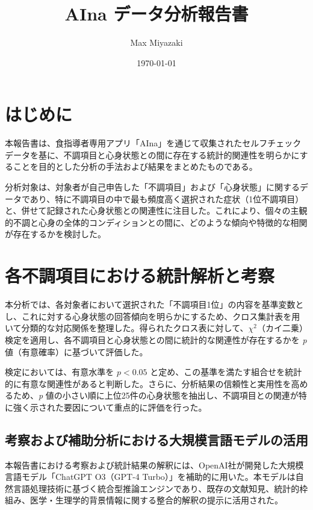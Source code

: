 \documentclass[a4paper,12pt]{article}
\title{AIna データ分析報告書}
\author[1,2]{Max Miyazaki}
\affil[1]{株式会社FiveVai}
\affil[2]{東京都立大学理学研究科物理学専攻}
\date{\today}
\begin{document}
\maketitle

\newpage
\tableofcontents
\newpage


\section*{はじめに}

本報告書は、食指導者専用アプリ「AIna」を通じて収集されたセルフチェックデータを基に、不調項目と心身状態との間に存在する統計的関連性を明らかにすることを目的とした分析の手法および結果をまとめたものである。

分析対象は、対象者が自己申告した「不調項目」および「心身状態」に関するデータであり、特に不調項目の中で最も頻度高く選択された症状（1位不調項目）と、併せて記録された心身状態との関連性に注目した。これにより、個々の主観的不調と心身の全体的コンディションとの間に、どのような傾向や特徴的な相関が存在するかを検討した。

\section*{各不調項目における統計解析と考察}

本分析では、各対象者において選択された「不調項目1位」の内容を基準変数とし、これに対する心身状態の回答傾向を明らかにするため、クロス集計表を用いて分類的な対応関係を整理した。得られたクロス表に対して、$\chi^2$（カイ二乗）検定を適用し、各不調項目と心身状態との間に統計的な関連性が存在するかを \textit{p} 値（有意確率）に基づいて評価した。

検定においては、有意水準を $p < 0.05$ と定め、この基準を満たす組合せを統計的に有意な関連性があると判断した。さらに、分析結果の信頼性と実用性を高めるため、\textit{p} 値の小さい順に上位25件の心身状態を抽出し、不調項目との関連が特に強く示された要因について重点的に評価を行った。


\subsection*{考察および補助分析における大規模言語モデルの活用}
本報告書における考察および統計結果の解釈には、OpenAI社が開発した大規模言語モデル「ChatGPT O3（GPT-4 Turbo）」を補助的に用いた。本モデルは自然言語処理技術に基づく統合型推論エンジンであり、既存の文献知見、統計的枠組み、医学・生理学的背景情報に関する整合的解釈の提示に活用された。
\end{document}
